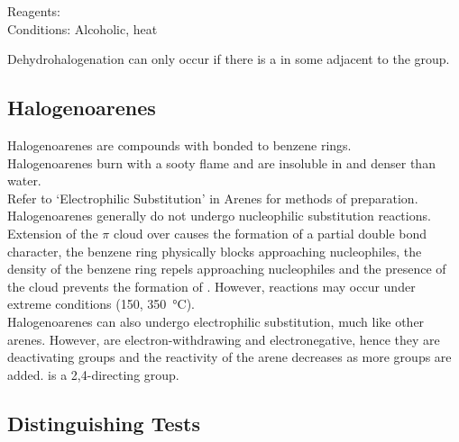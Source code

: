 \documentclass[../main]{subfiles}
\begin{document}
	Reagents:  \\
	Conditions: Alcoholic, heat \\


	Dehydrohalogenation can only occur if there is a  in some  adjacent to the  group. \\

	\subsection{Halogenoarenes}

	Halogenoarenes are compounds with  bonded to benzene rings. \\

	Halogenoarenes burn with a sooty flame and are insoluble in and denser than water. \\

	Refer to `Electrophilic Substitution' in Arenes for methods of preparation. \\

	Halogenoarenes generally do not undergo nucleophilic substitution reactions. Extension of the \(\pi\)  cloud over  causes the formation of a partial double bond character, the benzene ring physically blocks approaching nucleophiles, the  density of the benzene ring repels approaching nucleophiles and the presence of the  cloud prevents the formation of . However, reactions may occur under extreme conditions (\SI{150}{\atm}, \SI{350}{\celsius}).\\

	Halogenoarenes can also undergo electrophilic substitution, much like other arenes. However,  are electron-withdrawing and electronegative, hence they are deactivating groups and the reactivity of the arene decreases as more  groups are added.  is a 2,4-directing group.

	\subsection{Distinguishing Tests}
\end{document}
